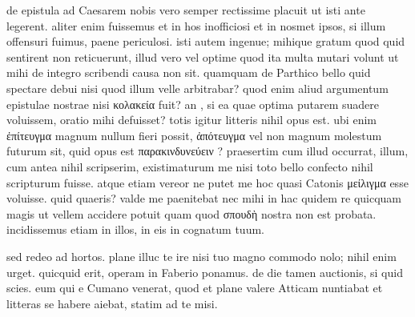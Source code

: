 


 de epistula ad Caesarem nobis vero semper rectissime placuit ut isti ante legerent. aliter enim fuissemus et in hos inofficiosi et in nosmet ipsos, si illum offensuri fuimus, paene periculosi. isti autem ingenue; mihique gratum quod quid sentirent non reticuerunt, illud vero vel optime quod ita multa mutari volunt ut mihi de integro scribendi causa non sit. quamquam de Parthico bello quid spectare debui nisi quod illum velle arbitrabar? quod enim aliud argumentum epistulae nostrae nisi κολακεία fuit? an , si ea quae optima putarem suadere voluissem, oratio mihi defuisset? totis igitur litteris nihil opus est. ubi enim ἐπίτευγμα magnum nullum fieri possit, ἀπότευγμα vel non magnum molestum futurum sit, quid opus est παρακινδυνεύειν ? praesertim cum illud occurrat, illum, cum antea nihil scripserim, existimaturum me nisi toto bello confecto nihil scripturum fuisse. atque etiam vereor ne putet me hoc quasi Catonis μείλιγμα esse voluisse. quid quaeris? valde me paenitebat nec mihi in hac quidem re quicquam magis ut vellem accidere potuit quam quod σπουδὴ nostra non est probata. incidissemus etiam in illos, in eis in cognatum tuum.

 sed redeo ad hortos. plane illuc te ire nisi tuo magno commodo nolo; nihil enim urget. quicquid erit, operam in Faberio ponamus. de die tamen auctionis, si quid scies. eum qui e Cumano venerat, quod et plane valere Atticam nuntiabat et litteras se habere aiebat, statim ad te misi.

